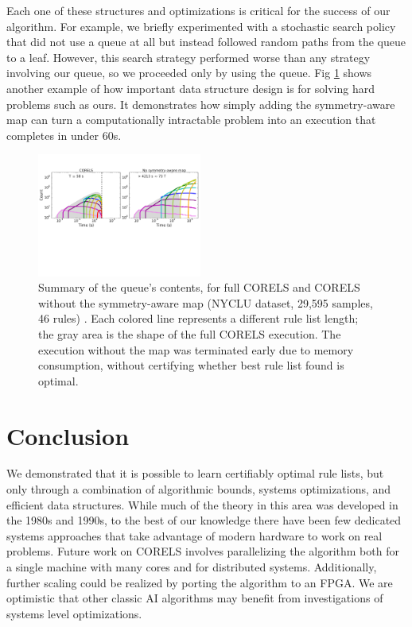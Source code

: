 \documentclass[format=sigconf]{acmart}
\begin{document}
Each one of these structures and optimizations is critical for the success of our algorithm.
For example, we briefly experimented with a stochastic search policy that did not use a queue at all but instead followed random paths from the queue to a leaf.
However, this search strategy performed worse than any strategy involving our queue, so we proceeded only by using the queue.
Fig \ref{fig:ablation} shows another example of how important data structure design is for solving hard problems such as ours.
It demonstrates how simply adding the symmetry-aware map can turn a computationally intractable problem into an execution that completes in under 60s.

\begin{figure}[t!]
\begin{center}
\includegraphics[trim={4mm 0mm 0mm 0mm}, width=0.48\textwidth]{figs/sysml_ablation-queue.pdf}
\end{center}
\vspace{-5mm}
\caption{Summary of the queue's contents, for full CORELS and CORELS without the symmetry-aware map (NYCLU dataset, 29,595 samples, 46 rules)  \citep{nyclu:2014}.
Each colored line represents a different rule list length; the gray area is the shape of the full CORELS execution.
The execution without the map was terminated early due to memory consumption, without certifying whether best rule list found is optimal.
}
\label{fig:ablation}
\end{figure}

\section{Conclusion}
We demonstrated that it is possible to learn certifiably optimal rule lists, but only through a combination of algorithmic bounds, systems optimizations, and efficient data structures.
While much of the theory in this area was developed in the 1980s and 1990s, to the best of our knowledge there have been few dedicated systems approaches that take advantage of modern hardware to work on real problems.
Future work on CORELS involves parallelizing the algorithm both for a single machine with many cores and for distributed systems.
Additionally, further scaling could be realized by porting the algorithm to an FPGA.
We are optimistic that other classic AI algorithms may benefit from investigations of systems level optimizations.


%

\end{document}
